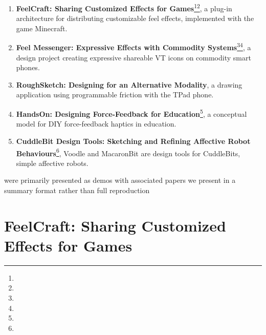 \begin{enumerate}
    \item[\bf\ref{sec:applications:feelcraft}]
    \textbf{FeelCraft: Sharing Customized Effects for Games}\footnote{}\footnote{}, a plug-in architecture for distributing customizable feel effects, implemented with the game Minecraft.
    
    \item[\bf\ref{sec:applications:feelmessenger}]
    \textbf{Feel Messenger: Expressive Effects with Commodity Systems}\footnote{}\footnote{}, a design project creating expressive shareable VT icons on commodity smart phones.
    
    \item[\bf\ref{sec:applications:roughsketch}]
    \textbf{RoughSketch: Designing for an Alternative Modality}, a drawing application using programmable friction with the TPad phone.
    
    \item[\bf\ref{sec:applications:handson}]
    \textbf{HandsOn: Designing Force-Feedback for Education}\footnote{}, a conceptual model for DIY force-feedback haptics in education. 
    
    \item[\bf\ref{sec:applications:cuddlebit}]
    \textbf{CuddleBit Design Tools: Sketching and Refining Affective Robot Behaviours}\footnote{}, Voodle and MacaronBit are design tools for CuddleBits, simple affective robots.
\end{enumerate}

\noindent
{}  were primarily presented as demos with associated papers we present  in a summary format rather than full reproduction

\section{FeelCraft: Sharing Customized Effects for Games}
\label{sec:applications:feelcraft}

